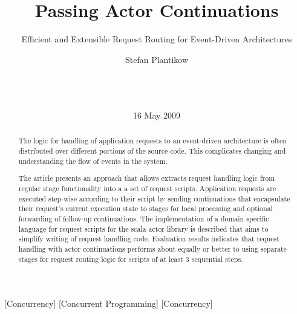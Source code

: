 \documentclass{sig-alternate}
\begin{document}

\title{Passing Actor Continuations}
\subtitle{Efficient and Extensible Request Routing for Event-Driven Architectures}


\author{
\alignauthor
Stefan Plantikow\\
       \\
       \\
       \\
}

\date{16 May 2009}


\maketitle

\begin{abstract}

The logic for handling of application requests to an event-driven architecture is often distributed
over different portions of the source code. This complicates changing and understanding the flow
of events in the system.

The article presents an approach that allows extracts request handling logic from regular stage
functionality into a a set of request scripts. Application requests are executed step-wise according
to their script by sending continuations that encapsulate their request's current execution state to
stages for local processing and optional forwarding of follow-up continuations. The implementation
of a domain specific language for request scripts for the scala actor library is described that aims
to simplify writing of request handling code. Evaluation results indicates that request handling
with actor continuations performs about equally or better to using separate stages for request
routing logic for scripts of at least 3 sequential steps.

\end{abstract}

[Concurrency]         
[Concurrent Programming]         
[Concurrency]
\end{document}
